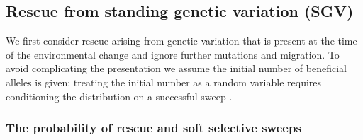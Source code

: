 \documentclass[]{article}
\begin{document}
\subsection*{Rescue from standing genetic variation (SGV)}
\label{sec:rescue_forward_SGV}

We first consider rescue arising from genetic variation that is present at the time of the environmental change and ignore further mutations and migration.
To avoid complicating the presentation we assume the initial number of beneficial alleles is given; treating the initial number as a random variable requires conditioning the distribution on a successful sweep \citep[][]{hermisson2017soft}.

\subsubsection*{The probability of rescue and soft selective sweeps}
\end{document}
